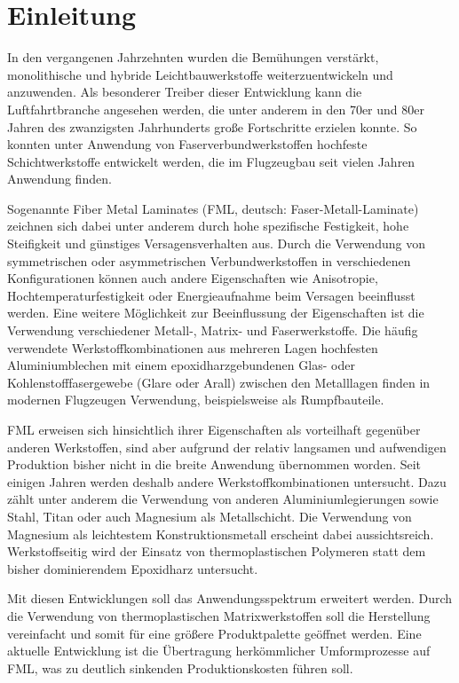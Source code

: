 \chapter{Einleitung}\label{ch:Einleit}

In den vergangenen Jahrzehnten wurden die Bemühungen verstärkt, monolithische und hybride Leichtbauwerkstoffe weiterzuentwickeln und anzuwenden.
Als besonderer Treiber dieser Entwicklung kann die Luftfahrtbranche angesehen werden, die unter anderem in den 70er und 80er Jahren des zwanzigsten Jahrhunderts große Fortschritte erzielen konnte.
So konnten unter Anwendung von Faserverbundwerkstoffen hochfeste Schichtwerkstoffe entwickelt werden, die im Flugzeugbau seit vielen Jahren Anwendung finden.

Sogenannte Fiber Metal Laminates (FML, deutsch: Faser-Metall-Laminate) zeichnen sich dabei unter anderem durch hohe spezifische Festigkeit, hohe Steifigkeit und günstiges Versagensverhalten aus.
Durch die Verwendung von symmetrischen oder asymmetrischen Verbundwerkstoffen in verschiedenen Konfigurationen können auch andere Eigenschaften wie Anisotropie, Hochtemperaturfestigkeit oder Energieaufnahme beim Versagen beeinflusst werden.
Eine weitere Möglichkeit zur Beeinflussung der Eigenschaften ist die Verwendung verschiedener Metall-, Matrix- und Faserwerkstoffe.
Die häufig verwendete Werkstoffkombinationen aus mehreren Lagen hochfesten Aluminiumblechen mit einem epoxidharzgebundenen Glas- oder Kohlenstofffasergewebe (Glare oder Arall) zwischen den Metalllagen finden in modernen Flugzeugen Verwendung, beispielsweise als Rumpfbauteile.

FML erweisen sich hinsichtlich ihrer Eigenschaften als vorteilhaft gegenüber anderen Werkstoffen, sind aber aufgrund der relativ langsamen und aufwendigen Produktion bisher nicht in die breite Anwendung übernommen worden. 
Seit einigen Jahren werden deshalb andere Werkstoffkombinationen untersucht.
Dazu zählt unter anderem die Verwendung von anderen Aluminiumlegierungen sowie Stahl, Titan oder auch Magnesium als Metallschicht.
Die Verwendung von Magnesium als leichtestem Konstruktionsmetall erscheint dabei aussichtsreich.
Werkstoffseitig wird der Einsatz von thermoplastischen Polymeren statt dem bisher dominierendem Epoxidharz untersucht. 

Mit diesen Entwicklungen soll das Anwendungsspektrum erweitert werden.
Durch die Verwendung von thermoplastischen Matrixwerkstoffen soll die Herstellung vereinfacht und somit für eine größere Produktpalette geöffnet werden.
Eine aktuelle Entwicklung ist die Übertragung herkömmlicher Umformprozesse auf FML, was zu deutlich sinkenden Produktionskosten führen soll.

